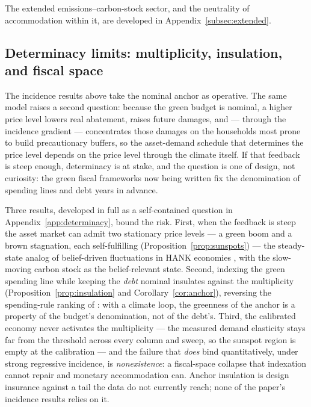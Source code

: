 \documentclass[12pt]{article}
\begin{document}
The extended emissions--carbon-stock sector, and the neutrality of accommodation within it, are developed in Appendix~\ref{subsec:extended}.


\subsection{Determinacy limits: multiplicity, insulation, and fiscal space}
\label{subsec:detlimits}

The incidence results above take the nominal anchor as operative. The same
model raises a second question: because the green budget is nominal, a
higher price level lowers real abatement, raises future damages, and ---
through the incidence gradient --- concentrates those damages on the
households most prone to build precautionary buffers, so the asset-demand
schedule that determines the price level depends on the price level through
the climate itself. If that feedback is steep enough, determinacy is at
stake, and the question is one of design, not curiosity: the green fiscal
frameworks now being written fix the denomination of spending lines and
debt years in advance.

Three results, developed in full as a self-contained question in
Appendix~\ref{app:determinacy}, bound the risk. First, when the feedback is
steep the asset market can admit two stationary price levels --- a green
boom and a brown stagnation, each self-fulfilling
(Proposition~\ref{prop:sunspots}) --- the steady-state analog of
belief-driven fluctuations in HANK economies \citep{acharyabenhabib2024},
with the slow-moving carbon stock as the belief-relevant state. Second,
indexing the green spending line while keeping the \emph{debt} nominal
insulates against the multiplicity (Proposition~\ref{prop:insulation} and
Corollary~\ref{cor:anchor}), reversing the spending-rule ranking of
\citet{hagedorn2026dtpl}: with a climate loop, the greenness of the anchor
is a property of the budget's denomination, not of the debt's. Third, the
calibrated economy never activates the multiplicity --- the measured demand
elasticity stays far from the threshold across every column and sweep, so
the sunspot region is empty at the calibration --- and the failure that
\emph{does} bind quantitatively, under strong regressive incidence, is
\emph{nonexistence}: a fiscal-space collapse that indexation cannot repair
and monetary accommodation can. Anchor insulation is design insurance
against a tail the data do not currently reach; none of the paper's
incidence results relies on it.
\end{document}
